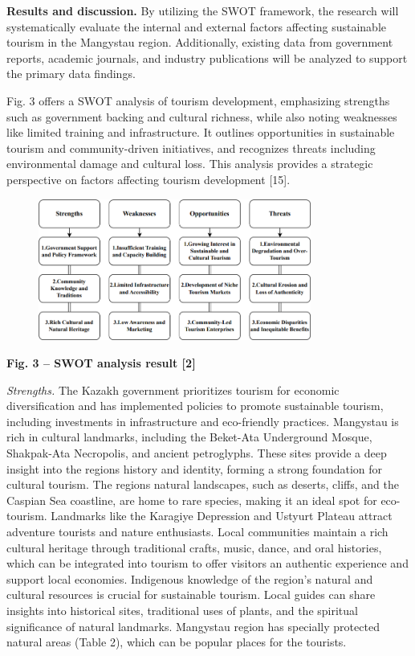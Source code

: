 {\bfseries Results and discussion.} By utilizing the SWOT framework, the
research will systematically evaluate the internal and external factors
affecting sustainable tourism in the Mangystau region. Additionally,
existing data from government reports, academic journals, and industry
publications will be analyzed to support the primary data findings.

Fig. 3 offers a SWOT analysis of tourism development, emphasizing
strengths such as government backing and cultural richness, while also
noting weaknesses like limited training and infrastructure. It outlines
opportunities in sustainable tourism and community-driven initiatives,
and recognizes threats including environmental damage and cultural loss.
This analysis provides a strategic perspective on factors affecting
tourism development {[}15{]}.

\begin{figure}[H]
	\centering
	\includegraphics[width=0.8\textwidth]{assets/339}
	\caption*{}
\end{figure}

{\bfseries Fig. 3 -- SWOT analysis result {[}2{]}}

\emph{Strengths.} The Kazakh government prioritizes tourism for economic
diversification and has implemented policies to promote sustainable
tourism, including investments in infrastructure and eco-friendly
practices. Mangystau is rich in cultural landmarks, including the
Beket-Ata Underground Mosque, Shakpak-Ata Necropolis, and ancient
petroglyphs. These sites provide a deep insight into the
region\textquotesingle s history and identity, forming a strong
foundation for cultural tourism. The region\textquotesingle s natural
landscapes, such as deserts, cliffs, and the Caspian Sea coastline, are
home to rare species, making it an ideal spot for eco-tourism. Landmarks
like the Karagiye Depression and Ustyurt Plateau attract adventure
tourists and nature enthusiasts. Local communities maintain a rich
cultural heritage through traditional crafts, music, dance, and oral
histories, which can be integrated into tourism to offer visitors an
authentic experience and support local economies. Indigenous knowledge
of the region's natural and cultural resources is crucial for
sustainable tourism. Local guides can share insights into historical
sites, traditional uses of plants, and the spiritual significance of
natural landmarks. Mangystau region has specially protected natural
areas (Table 2), which can be popular places for the tourists.

